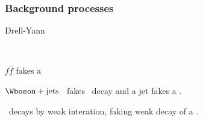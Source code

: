 \begin{frame}
\frametitle{Background processes}
\begin{block}{Drell-Yann}
\begin{minipage}[c]{.45\textwidth}
\vspace{\baselineskip}



~
\end{minipage}
\begin{minipage}[c]{.45\linewidth}
$f\bar{f}$ fakes a \leptau\antitau
\end{minipage}
\end{block}

\begin{block}{$\Wboson+\text{jets}$}
\Wboson\ fakes \tau\ decay and a jet fakes a \tauh.
\end{block}

\begin{block}{\quarkt\antiquarkt}
\quarkt\ decays by weak interation, faking weak decay of a \tau.
\end{block}

\end{frame}